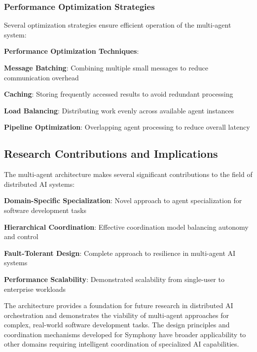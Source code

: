 \subsubsection*{Performance Optimization Strategies}

Several optimization strategies ensure efficient operation of the multi-agent system:

\begin{successbox}
\textbf{Performance Optimization Techniques}:
\begin{compactlist}
    \item \textbf{Message Batching}: Combining multiple small messages to reduce communication overhead
    \item \textbf{Caching}: Storing frequently accessed results to avoid redundant processing
    \item \textbf{Load Balancing}: Distributing work evenly across available agent instances
    \item \textbf{Pipeline Optimization}: Overlapping agent processing to reduce overall latency
\end{compactlist}
\end{successbox}

\subsection*{Research Contributions and Implications}

The multi-agent architecture makes several significant contributions to the field of distributed AI systems:

\begin{expandedlist}
    \item \textbf{Domain-Specific Specialization}: Novel approach to agent specialization for software development tasks
    \item \textbf{Hierarchical Coordination}: Effective coordination model balancing autonomy and control
    \item \textbf{Fault-Tolerant Design}: Complete approach to resilience in multi-agent AI systems
    \item \textbf{Performance Scalability}: Demonstrated scalability from single-user to enterprise workloads
\end{expandedlist}

The architecture provides a foundation for future research in distributed AI orchestration and demonstrates the viability of multi-agent approaches for complex, real-world software development tasks. The design principles and coordination mechanisms developed for Symphony have broader applicability to other domains requiring intelligent coordination of specialized AI capabilities.
